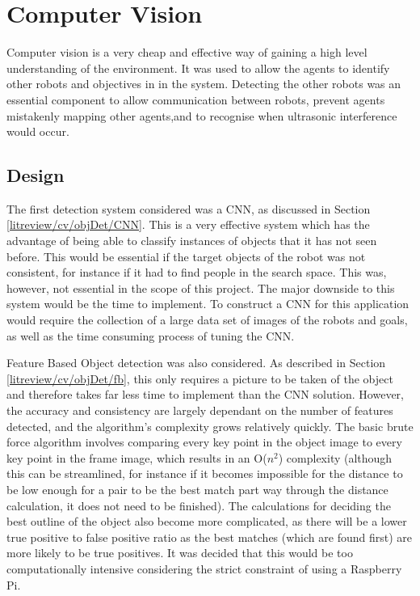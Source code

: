 \section{Computer Vision}\label{soft/cv}
Computer vision is a very cheap and effective way of gaining a high level 
understanding of the environment. It was used to allow the agents to 
identify other robots and objectives in in the system. Detecting the other 
robots was an essential component to allow communication between robots, 
prevent agents mistakenly mapping other agents,and to recognise when 
ultrasonic interference would occur.

\subsection{Design}\label{soft/cv/design}
The first detection system considered was a CNN, as discussed in Section 
\ref{litreview/cv/objDet/CNN}. This is a very effective system which has 
the advantage of
being able to classify instances of objects that it has not
seen before. This would be essential if the target objects of
the robot was not consistent, for instance if it had to find
people in the search space. This was, however, not essential
in the scope of this project. The major downside to this
system would be the time to implement. To construct a CNN for
this application would require the collection of a large data
set of images of the robots and goals, as well as the time
consuming process of tuning the CNN.

Feature Based Object detection was also considered. As described in 
Section \ref{litreview/cv/objDet/fb}, this only requires a picture to be 
taken of the object and therefore takes far less time to
implement than the CNN solution. However, the accuracy and
consistency are largely dependant on the number of features
detected, and the algorithm's complexity grows relatively
quickly. The basic brute force algorithm involves comparing
every key point in the object image to every key point in the
frame image, which results in an O($n^2$) complexity (although
this can be streamlined, for instance if it becomes impossible
for the distance to be low enough for a pair to be the best
match part way through the distance calculation, it does not
need to be finished). The calculations for deciding the best
outline of the object also become more complicated, as there
will be a lower true positive to false positive ratio as the
best matches (which are found first) are more likely to be
true positives. It was decided that this would be too
computationally intensive considering the strict constraint of
using a Raspberry Pi.

